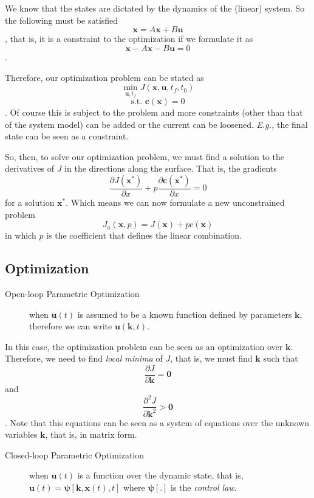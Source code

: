 We know that the states are dictated by the dynamics of the (linear) system. So the following must be satisfied \[
    \dot{\bm{x}} = A\bm{x} + B\bm{u}
\], that is, it is a constraint to the optimization if we formulate it as \[
    \dot{\bm{x}} - A\bm{x} - B\bm{u} = 0
\].

Therefore, our optimization problem can be stated as \[
    \min_{\bm{u}, t_f} J(\bm{x},\bm{u},t_f,t_0)
\] \[
\textrm{s.t. } \bm{c}(\bm{x}) = 0
\]. Of course this is subject to the problem and more constraints (other than that of the system model) can be added or the current can be loosened. \emph{E.g.,} the final state can be seen as a constraint.

So, then, to solve our optimization problem, we must find a solution to the derivatives of $J$ in the directions along the surface. That is, the gradients \[
    \frac{\partial J(\bm{x}^*)}{\partial x} + p \frac{\partial \bm{c}(\bm{x}^*)}{\partial x} = 0
\] for a solution $\bm{x}^*$. Which means we can now formulate a new unconstrained problem \[
    J_a(\bm{x}, p) = J(\bm{x}) + pc(\bm{x})
\] in which $p$ is the coefficient that defines the linear combination.

\subsection*{Optimization}

\begin{description}
    \item[Open-loop Parametric Optimization] when $\bm{u}(t)$ is assumed to be a known function defined by parameters $\bm{k}$, therefore we can write $\bm{u}(\bm{k},t)$.
\end{description}

In this case, the optimization problem can be seen as an optimization over $\bm{k}$. Therefore, we need to find \emph{local minima} of $J$, that is, we must find $\bm{k}$ such that \[
    \frac{\partial J}{\partial \bm{k}}=\bm{0}
\] and \[
\frac{\partial^{2}J}{\partial \bm{k}^{2}}>\bm{0}
\]. Note that this equations can be seen as a system of equations over the unknown variables $\bm{k}$, that is, in matrix form.

\begin{description}
    \item[Closed-loop Parametric Optimization] when  $\bm{u}(t)$ is a function over the dynamic state, that is, $\bm{u}(t) = \bm{\psi}[\bm{k},\bm{x}(t),t]$ where $\bm{\psi}[.]$ is the \emph{control law}.
\end{description}

